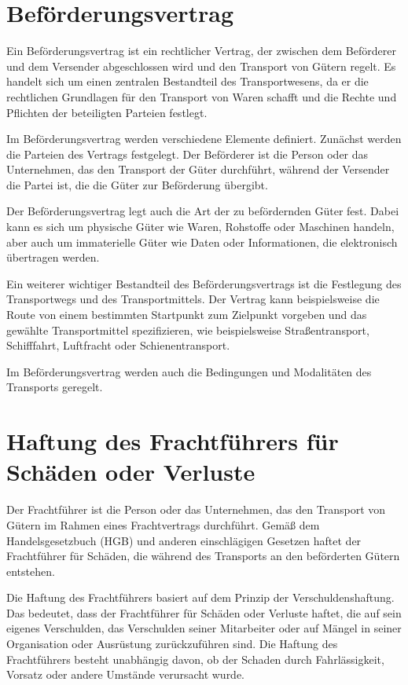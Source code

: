 \section{Beförderungsvertrag}
Ein Beförderungsvertrag ist ein rechtlicher Vertrag, der zwischen dem Beförderer und dem Versender abgeschlossen wird und den Transport von Gütern regelt. Es handelt sich um einen zentralen Bestandteil des Transportwesens, da er die rechtlichen Grundlagen für den Transport von Waren schafft und die Rechte und Pflichten der beteiligten Parteien festlegt.

Im Beförderungsvertrag werden verschiedene Elemente definiert. Zunächst werden die Parteien des Vertrags festgelegt. Der Beförderer ist die Person oder das Unternehmen, das den Transport der Güter durchführt, während der Versender die Partei ist, die die Güter zur Beförderung übergibt.

Der Beförderungsvertrag legt auch die Art der zu befördernden Güter fest. Dabei kann es sich um physische Güter wie Waren, Rohstoffe oder Maschinen handeln, aber auch um immaterielle Güter wie Daten oder Informationen, die elektronisch übertragen werden.

Ein weiterer wichtiger Bestandteil des Beförderungsvertrags ist die Festlegung des Transportwegs und des Transportmittels. Der Vertrag kann beispielsweise die Route von einem bestimmten Startpunkt zum Zielpunkt vorgeben und das gewählte Transportmittel spezifizieren, wie beispielsweise Straßentransport, Schifffahrt, Luftfracht oder Schienentransport.

Im Beförderungsvertrag werden auch die Bedingungen und Modalitäten des Transports geregelt.
\section{Haftung des Frachtführers für Schäden oder Verluste}
Der Frachtführer ist die Person oder das Unternehmen, das den Transport von Gütern im Rahmen eines Frachtvertrags durchführt. Gemäß dem Handelsgesetzbuch (HGB) und anderen einschlägigen Gesetzen haftet der Frachtführer für Schäden, die während des Transports an den beförderten Gütern entstehen.

Die Haftung des Frachtführers basiert auf dem Prinzip der Verschuldenshaftung. Das bedeutet, dass der Frachtführer für Schäden oder Verluste haftet, die auf sein eigenes Verschulden, das Verschulden seiner Mitarbeiter oder auf Mängel in seiner Organisation oder Ausrüstung zurückzuführen sind. Die Haftung des Frachtführers besteht unabhängig davon, ob der Schaden durch Fahrlässigkeit, Vorsatz oder andere Umstände verursacht wurde.

